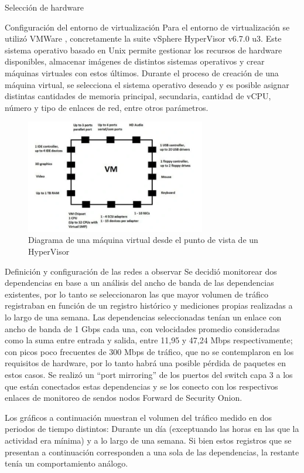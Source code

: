 \begin{section}{Selección de hardware}
        \begin{subsection}{Configuración del entorno de virtualización}
        Para el entorno de virtualización se utilizó VMWare \cite{vmware}, concretamente la suite vSphere HyperVisor v6.7.0 u3. Este sistema operativo basado en Unix permite gestionar los recursos de hardware disponibles, almacenar imágenes de distintos sistemas operativos y crear máquinas virtuales con estos últimos. Durante el proceso de creación de una máquina virtual, se selecciona el sistema operativo deseado y es posible asignar distintas cantidades de memoria principal, secundaria, cantidad de vCPU, número y tipo de enlaces de red, entre otros parámetros. \par
         \begin{figure}[H]
          \centering
           \includegraphics[width=0.7\textwidth]{./iteracion_2_imagenes/figura_34_diagrama_VM.png}
            \caption{ Diagrama de una máquina virtual desde el punto de vista de un HyperVisor\cite{vmware}}
            \label{fig:maquina_virtual}
        \end{figure}
        \end{subsection}
        
        \begin{subsection}{Definición y configuración de las redes a observar}
            Se decidió monitorear dos dependencias en base a un análisis del ancho de banda de las dependencias existentes, por lo tanto se seleccionaron las que mayor volumen de tráfico registraban en función de un registro histórico y mediciones propias realizadas a lo largo de una semana. Las dependencias seleccionadas tenían un enlace con ancho de banda de 1 Gbps cada una, con  velocidades promedio consideradas como la suma entre entrada y salida, entre 11,95 y 47,24 Mbps respectivamente; con picos poco frecuentes de 300 Mbps de tráfico, que no se contemplaron en los requisitos de hardware, por lo tanto habrá una posible pérdida de paquetes en estos casos. Se realizó un “port mirroring” de los puertos del switch capa 3 a los que están conectados estas dependencias y se los conecto con los respectivos enlaces de monitoreo de sendos nodos Forward de Security Onion. \par
            Los gráficos a continuación muestran el volumen del tráfico medido en dos periodos de tiempo distintos: Durante un día (exceptuando las horas en las que la actividad era mínima) y a lo largo de una semana. Si bien estos registros que se presentan a continuación corresponden a una sola de las dependencias, la restante tenía un comportamiento análogo. \par
            

\end{subsection}
\end{section}
